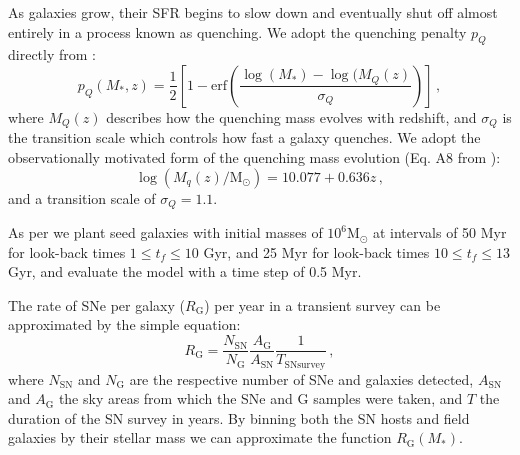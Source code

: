 \documentclass[fleqn,usenatbib]{mnras}
\begin{document}
As galaxies grow, their SFR begins to slow down and eventually shut off almost entirely in a process known as quenching. We adopt the quenching penalty $p_Q$ directly from \citet{Childress2014}:
\begin{equation}
    p_Q(M_*,z) = \frac{1}{2}\left[1 - \mathrm{erf}\left(\frac{\log(M_*) - \log(M_Q(z)}{\sigma_Q}\right)\right]\,,
\end{equation}
where $M_Q(z)$ describes how the quenching mass evolves with redshift, and $\sigma_Q$ is the transition scale which controls how fast a galaxy quenches. We adopt the observationally motivated form of the quenching mass evolution (Eq. A8 from \citealt{Childress2014}):
\begin{equation}
    \log(M_q(z)/\mathrm{M}_{\odot}) = 10.077 + 0.636z \,, 
\end{equation}
and a transition scale of $\sigma_Q = 1.1$. 

As per \citet{Childress2014} we plant seed galaxies with initial masses of $10^6 \mathrm{M}_{\odot}$ at intervals of 50 Myr for look-back times $1 \leq t_f \leq 10$ Gyr, and 25 Myr for look-back times $10 \leq t_f \leq 13$ Gyr, and evaluate the model with a time step of 0.5 Myr.

The rate of SNe per galaxy ($R_{\mathrm{G}}$) per year in a transient survey can be approximated by the simple equation:
\begin{equation}
    R_{\mathrm{G}} = \frac{N_{\mathrm{SN}}}{N_{\mathrm{G}}} \frac{A_{\mathrm{G}}}{A_{\mathrm{SN}}} \frac{1}{T_{\mathrm{SN  survey}}}\,,
\label{eq:rate1}
\end{equation}
where $N_{\mathrm{SN}}$ and $N_{\mathrm{G}}$ are the respective number of SNe and galaxies detected, $A_{\mathrm{SN}}$ and $A_{\mathrm{G}}$ the sky areas from which the SNe and G samples were taken, and $T$ the duration of the SN survey in years. By binning both the SN hosts and field galaxies by their stellar mass we can approximate the function $R_{\mathrm{G}}(M_*)$.
\end{document}
